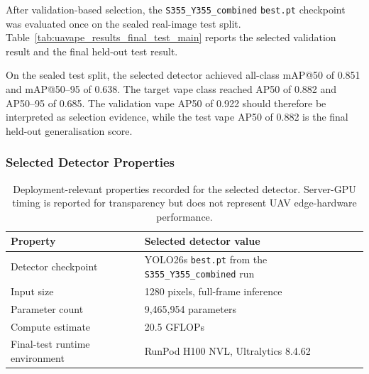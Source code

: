 After validation-based selection, the \texttt{S355\_Y355\_combined} \texttt{best.pt} checkpoint was evaluated once on the sealed real-image test split. Table~\ref{tab:uavape_results_final_test_main} reports the selected validation result and the final held-out test result.

\begin{table}[H]
\centering
\scriptsize
{}
\caption{Validation and sealed test results for the selected \texttt{S355\_Y355\_combined} recipe.}
\label{tab:uavape_results_final_test_main}
\end{table}

On the sealed test split, the selected detector achieved all-class mAP@50 of 0.851 and mAP@50--95 of 0.638. The target vape class reached AP50 of 0.882 and AP50--95 of 0.685. The validation vape AP50 of 0.922 should therefore be interpreted as selection evidence, while the test vape AP50 of 0.882 is the final held-out generalisation score.

\subsubsection{Selected Detector Properties}

\begin{table}[H]
\centering
\small
\begin{tabularx}{\textwidth}{p{} X}
\toprule
\textbf{Property} & \textbf{Selected detector value} \\
\midrule
Detector checkpoint & YOLO26s \texttt{best.pt} from the \texttt{S355\_Y355\_combined} run \\
Input size & 1280 pixels, full-frame inference \\
Parameter count & 9,465,954 parameters \\
Compute estimate & 20.5 GFLOPs \\
Final-test runtime environment & RunPod H100 NVL, Ultralytics 8.4.62 \\
\bottomrule
\end{tabularx}
\caption{Deployment-relevant properties recorded for the selected detector. Server-GPU timing is reported for transparency but does not represent UAV edge-hardware performance.}
\label{tab:uavape_results_selected_detector_deployment_properties_main}
\end{table}


